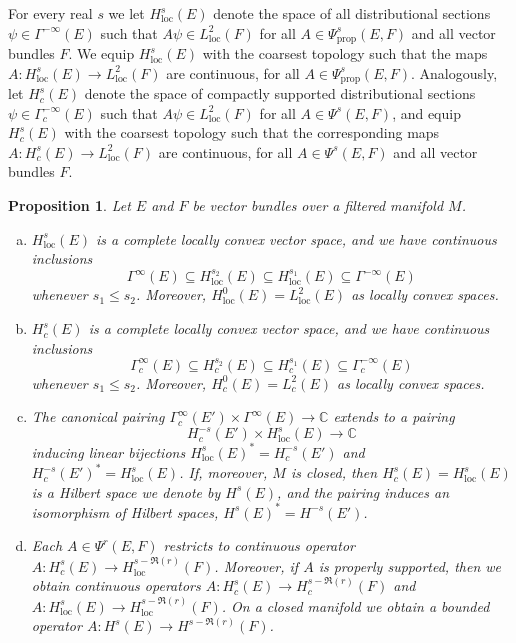 \documentclass[reqno,12pt]{amsart}
\newcommand\C{\mathbb C}
\newcommand\prop{\textrm{prop}}
\newcommand\loc{\textrm{loc}}
\theoremstyle{plain}
\newtheorem{proposition}[theorem]{Proposition}
\theoremstyle{definition}
\begin{document}
For every real $s$ we let $H^s_\loc(E)$ denote the space of all distributional sections $\psi\in\Gamma^{-\infty}(E)$ such that $A\psi\in L^2_\loc(F)$ for all $A\in\Psi^s_\prop(E,F)$ and all vector bundles $F$.
We equip $H^s_\loc(E)$ with the coarsest topology such that the maps $A\colon H^s_\loc(E)\to L^2_\loc(F)$ are continuous, for all $A\in\Psi_\prop^s(E,F)$.
Analogously, let $H^s_c(E)$ denote the space of compactly supported distributional sections $\psi\in\Gamma_c^{-\infty}(E)$ such that $A\psi\in L^2_\loc(F)$ for all $A\in\Psi^s(E,F)$, and equip $H^s_c(E)$ with the coarsest topology such that the corresponding maps $A\colon H^s_c(E)\to L^2_\loc(F)$ are continuous, for all $A\in\Psi^s(E,F)$ and all vector bundles $F$.


\begin{proposition}\label{P:Hs}
Let $E$ and $F$ be vector bundles over a filtered manifold $M$.
\begin{enumerate}[(a)]
\item\label{P:Hs:locfilt}
$H^s_\loc(E)$ is a complete locally convex vector space, and we have continuous inclusions
$$
\Gamma^\infty(E)\subseteq H^{s_2}_\loc(E)\subseteq H^{s_1}_\loc(E)\subseteq\Gamma^{-\infty}(E)
$$
whenever $s_1\leq s_2$.
Moreover, $H^0_\loc(E)=L^2_\loc(E)$ as locally convex spaces.

\item\label{P:Hs:cfilt}
$H^s_c(E)$ is a complete locally convex vector space, and we have continuous inclusions
$$
\Gamma^\infty_c(E)\subseteq H^{s_2}_c(E)\subseteq H^{s_1}_c(E)\subseteq\Gamma^{-\infty}_c(E)
$$
whenever $s_1\leq s_2$.
Moreover, $H^0_c(E)=L^2_c(E)$ as locally convex spaces.

\item\label{P:Hs:pairing}
The canonical pairing $\Gamma^\infty_c(E')\times\Gamma^\infty(E)\to\C$ extends to a pairing 
$$
H^{-s}_c(E')\times H^s_\loc(E)\to\C
$$ 
inducing linear bijections $H^s_\loc(E)^*=H^{-s}_c(E')$ and $H^{-s}_c(E')^*=H^s_\loc(E)$.
If, moreover, $M$ is closed, then $H^s_c(E)=H^s_\loc(E)$ is a Hilbert space we denote by $H^s(E)$, and the pairing induces an isomorphism of Hilbert spaces, $H^s(E)^*=H^{-s}(E')$.

\item\label{P:Hs:operators}
Each $A\in\Psi^r(E,F)$ restricts to continuous operator $A\colon H^s_c(E)\to H_\loc^{s-\Re(r)}(F)$.
Moreover, if $A$ is properly supported, then we obtain continuous operators $A\colon H^s_c(E)\to H_c^{s-\Re(r)}(F)$ and $A\colon H^s_\loc(E)\to H_\loc^{s-\Re(r)}(F)$.
On a closed manifold we obtain a bounded operator $A\colon H^s(E)\to H^{s-\Re(r)}(F)$.



\end{enumerate}
\end{proposition}
\end{document}

